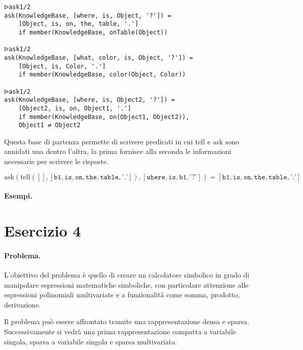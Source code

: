 \documentclass[12pt,twoside]{report}
\begin{document}
\begin{lstlisting}
ᐅask1/2
ask(KnowledgeBase, [where, is, Object, '?']) = 
    [Object, is, on, the, table, '.']
    if member(KnowledgeBase, onTable(Object))

ᐅask1/2
ask(KnowledgeBase, [what, color, is, Object, '?']) = 
    [Object, is, Color, '.']
    if member(KnowledgeBase, color(Object, Color))

ᐅask1/2
ask(KnowledgeBase, [where, is, Object2, '?']) = 
    [Object2, is, on, Object1, '.']
    if member(KnowledgeBase, on(Object1, Object2)), 
    Object1 ≠ Object2
\end{lstlisting}

Questa base di partenza permette di scrivere predicati in cui tell e ask sono annidati una dentro l'altra, la prima fornisce alla seconda le informazioni necessarie per scrivere le risposte.


\[
\text{ask}(\text{tell}([], [\texttt{b1}, \texttt{is}, \texttt{on}, \texttt{the}, \texttt{table}, \texttt{'.'}]), [\texttt{where}, \texttt{is}, \texttt{b1}, \texttt{'?'}]) = [\texttt{b1}, \texttt{is}, \texttt{on}, \texttt{the}, \texttt{table}, \texttt{'.'}]
\]



\paragraph{Esempi.}


\cleardoublepage

\section*{Esercizio 4}

\paragraph{Problema.} L'obiettivo del problema è quello di creare un calcolatore simbolico in grado di manipolare espressioni matematiche simboliche, con particolare attenzione alle espressioni polinomiali multivariate e a funzionalità come somma, prodotto, derivazione.

Il problema può essere affrontato tramite una rappresentazione densa e sparsa. Successivamente si vedrà una prima rappresentazione compatta a variabile singola, sparsa a variabile singola e sparsa multivariata.
\end{document}
